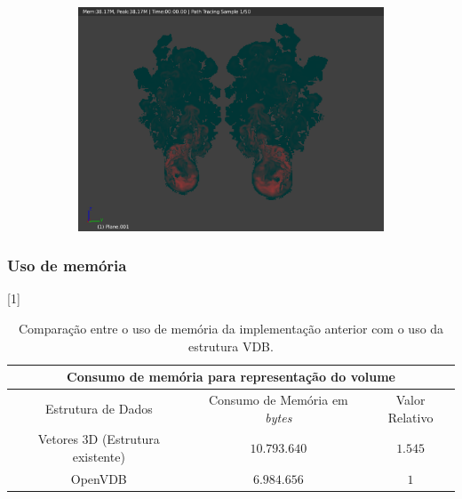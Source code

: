 \documentclass{beamer}
\begin{document}
\begin{frame}
\begin{figure}[!htb]
\begin{subfigure}{0.3\textwidth}
        \end{subfigure}
        ~ %
        \begin{subfigure}{0.3\textwidth}
                \includegraphics[width=\textwidth]{transf_Mirror}
        \end{subfigure}    
\end{figure}
\end{frame}

\begin{frame}

\frametitle{Uso de memória}
\begin{table}[!ht]
    \centering
    \scalebox{0.8}[1]{
        \begin{tabular}{|c|c|c|}
\hline

\multicolumn{3}{|c|}{\bf{Consumo de memória para representação do volume}} \\
\hline \hline
Estrutura de Dados & Consumo de Memória em {\it bytes} & Valor Relativo\\

\hline
 
Vetores 3D (Estrutura existente) & $10.793.640$ &  $1.545$  \\

\hline
 
OpenVDB & $6.984.656$ & $1$ \\

\hline
 

\end{tabular}}
    \caption{Comparação entre o uso de memória da implementação anterior com o uso da estrutura VDB.}
\end{table}
\end{frame}
\end{document}
